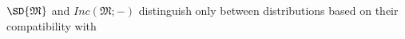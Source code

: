 \documentclass{article}
\theoremstyle{plain}
\theoremstyle{definition}
\theoremstyle{remark}
\newcommand{\dg}[1]{\mathfrak{#1}}
\newcommand\Inc{\mathit{Inc}}
\numberwithin{equation}{section}
\begin{document}
$\SD{\dg M}$ and $\Inc(\dg M;-)$ distinguish only
        between distributions based on their compatibility with
% 
\end{document}
